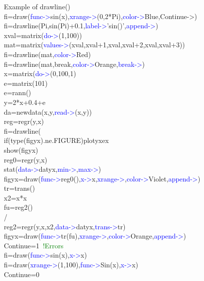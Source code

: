 \begin{example}[drawlineex]Example of \textcolor{VioletRed}{drawline}()\\
\label{drawlineex}
fi=\textcolor{VioletRed}{draw}(\textcolor{blue}{func->}\textcolor{VioletRed}{sin}(x),\textcolor{blue}{xrange->}(0,2*Pi),\textcolor{blue}{color->}Blue,Continue->)\\
fi=\textcolor{VioletRed}{drawline}(Pi,\textcolor{VioletRed}{sin}(Pi)+0.1,\textcolor{blue}{label->}'\textcolor{VioletRed}{sin}()',\textcolor{blue}{append->})\\
xval=\textcolor{VioletRed}{matrix}(\textcolor{blue}{do->}(1,100))\\
mat=\textcolor{VioletRed}{matrix}(\textcolor{blue}{values->}(xval,xval+1,xval,xval+2,xval,xval+3))\\
fi=\textcolor{VioletRed}{drawline}(mat,\textcolor{blue}{color->}Red)\\
fi=\textcolor{VioletRed}{drawline}(mat,break,\textcolor{blue}{color->}Orange,\textcolor{blue}{break->})\\
x=\textcolor{VioletRed}{matrix}(\textcolor{blue}{do->}(0,100,1)\\
e=\textcolor{VioletRed}{matrix}(101)\\
e=\textcolor{VioletRed}{rann}()\\
y=2*x+0.4+e\\
da=\textcolor{VioletRed}{newdata}(x,y,\textcolor{blue}{read->}(x,y))\\
reg=\textcolor{VioletRed}{regr}(y,x)\\
fi=\textcolor{VioletRed}{drawline}(\\
\textcolor{VioletRed}{if}(\textcolor{VioletRed}{type}(figyx).ne.FIGURE)plotyxex\\
\textcolor{VioletRed}{show}(figyx)\\
reg0=\textcolor{VioletRed}{regr}(y,x)\\
\textcolor{VioletRed}{stat}(\textcolor{blue}{data->}datyx,\textcolor{blue}{min->},\textcolor{blue}{max->})\\
figyx=\textcolor{VioletRed}{draw}(\textcolor{blue}{func->}reg0(),\textcolor{blue}{x->}x,\textcolor{blue}{xrange->},\textcolor{blue}{color->}Violet,\textcolor{blue}{append->})\\
tr=\textcolor{VioletRed}{trans}()\\
x2=x*x\\
fu=reg2()\\
/\\
reg2=\textcolor{VioletRed}{regr}(y,x,x2,\textcolor{blue}{data->}datyx,\textcolor{blue}{trans->}tr)\\
figyx=\textcolor{VioletRed}{draw}(\textcolor{blue}{func->}tr(fu),\textcolor{blue}{xrange->},\textcolor{blue}{color->}Orange,\textcolor{blue}{append->})\\
Continue=1 \,\textcolor{green}{!Errors}\\
fi=\textcolor{VioletRed}{draw}(\textcolor{blue}{func->}\textcolor{VioletRed}{sin}(x),\textcolor{blue}{x->}x)\\
fi=\textcolor{VioletRed}{draw}(\textcolor{blue}{xrange->}(1,100),\textcolor{blue}{func->}Sin(x),\textcolor{blue}{x->}x)\\
Continue=0
\end{example}
